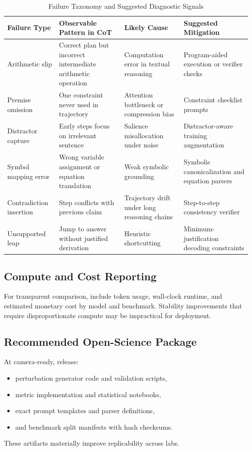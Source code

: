 \documentclass[conference]{IEEEtran}
\begin{document}
\begin{table}[!t]
\caption{Failure Taxonomy and Suggested Diagnostic Signals}
\label{tab:failure-taxonomy}
\centering
\begin{tabular}{p{2.4cm}p{4.3cm}p{4.8cm}p{2.8cm}}
\toprule
Failure Type & Observable Pattern in CoT & Likely Cause & Suggested Mitigation \\
\midrule
Arithmetic slip & Correct plan but incorrect intermediate arithmetic operation & Computation error in textual reasoning & Program-aided execution or verifier checks \\
Premise omission & One constraint never used in trajectory & Attention bottleneck or compression bias & Constraint checklist prompts \\
Distractor capture & Early steps focus on irrelevant sentence & Salience misallocation under noise & Distractor-aware training augmentation \\
Symbol mapping error & Wrong variable assignment or equation translation & Weak symbolic grounding & Symbolic canonicalization and equation parsers \\
Contradiction insertion & Step conflicts with previous claim & Trajectory drift under long reasoning chains & Step-to-step consistency verifier \\
Unsupported leap & Jump to answer without justified derivation & Heuristic shortcutting & Minimum-justification decoding constraints \\
\bottomrule
\end{tabular}
\end{table}

\subsection{Compute and Cost Reporting}
For transparent comparison, include token usage, wall-clock runtime, and estimated monetary cost by model and benchmark. Stability improvements that require disproportionate compute may be impractical for deployment.

\subsection{Recommended Open-Science Package}
At camera-ready, release:
\begin{itemize}[leftmargin=*]
\item perturbation generator code and validation scripts,
\item metric implementation and statistical notebooks,
\item exact prompt templates and parser definitions,
\item and benchmark split manifests with hash checksums.
\end{itemize}
These artifacts materially improve replicability across labs.
\end{document}
